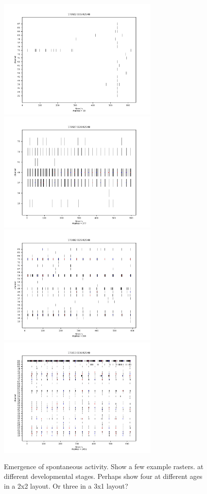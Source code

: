 \documentclass[11pt]{article}
\begin{document}
{\begin{figure}
  \centering
  \includegraphics[width=8cm]{../plots/supplementary_figures/burst_plot_1.pdf}
  \includegraphics[width=8cm]{../plots/supplementary_figures/burst_plot_2.pdf}
  \includegraphics[width=8cm]{../plots/supplementary_figures/burst_plot_3.pdf}
  \includegraphics[width=8cm]{../plots/supplementary_figures/burst_plot_4.pdf}
  \caption{Emergence of spontaneous activity.  Show a few example rasters.
    at different developmental stages.  Perhaps show four at different
  ages in a 2x2 layout.  Or three in a 3x1 layout?}
  \label{fig:rasters}
\end{figure}


}
\end{document}
